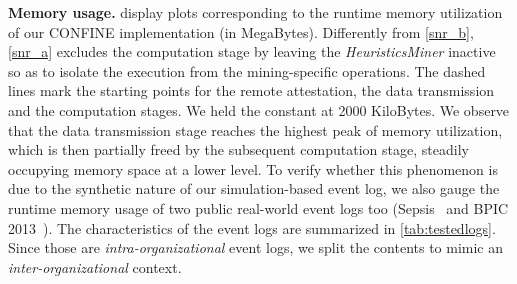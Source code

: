 \noindent\textbf{Memory usage.} \label{sec:evaluation:subsec:MemoryUsage}  display plots corresponding to the runtime memory utilization of our CONFINE implementation (in MegaBytes). Differently from \cref{snr_b}, \cref{snr_a} excludes the computation stage by leaving the \emph{HeuristicsMiner} inactive so as to isolate the execution from the mining-specific operations. %
The dashed lines mark %
the starting points for the remote attestation, the data transmission and the computation stages. %
We held the {\SegSize}  constant at \num{2000} KiloBytes. %
We observe that the data transmission stage reaches the highest peak of memory utilization, %
which is then partially freed by the subsequent computation stage, steadily occupying memory space at a lower level. %
To verify whether this phenomenon is due to the synthetic nature of our simulation-based event log, we also gauge the runtime memory usage of two public real-world event logs too (Sepsis~\citep{seps} and BPIC 2013~\citep{bpic2013}). %
The characteristics of the event logs are summarized in \cref{tab:testedlogs}.
Since those are \textit{intra-organizational} event logs, we %
split the contents to mimic an \textit{inter-organizational} context.
